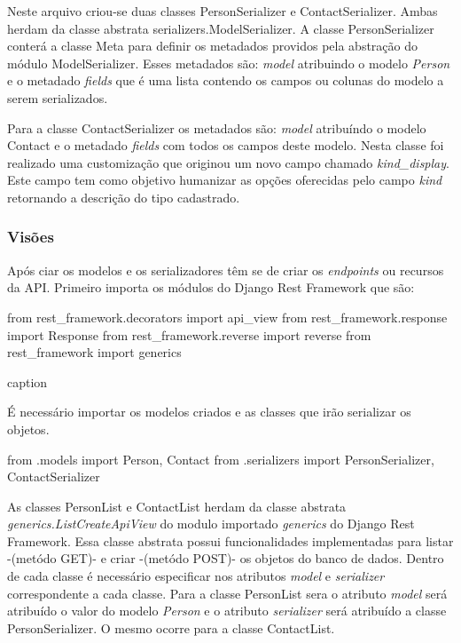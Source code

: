   Neste arquivo criou-se duas classes PersonSerializer e ContactSerializer. Ambas herdam da classe abstrata serializers.ModelSerializer.
  A classe PersonSerializer conterá a classe Meta para definir os metadados providos pela abstração do módulo ModelSerializer. Esses 
  metadados são: \textit{model} atribuindo o modelo \textit{Person} e o metadado \textit{fields} que é uma lista contendo os campos ou colunas
  do modelo a serem serializados.
  
  Para a classe ContactSerializer os metadados são: \textit{model} atribuíndo o modelo Contact e o metadado \textit{fields} com todos os
  campos deste modelo. Nesta classe foi realizado uma customização que originou um novo campo chamado \textit{kind\_display}. Este campo
  tem como objetivo humanizar as opções oferecidas pelo campo \textit{kind} retornando a descrição do tipo cadastrado.

\subsubsection{Visões}

  Após ciar os modelos e os serializadores têm se de criar os \textit{endpoints} ou recursos da API. Primeiro importa os módulos
  do Django Rest Framework que são:
  \begin{algorithm}[H]
  from rest\_framework.decorators import api\_view
  from rest\_framework.response import Response
  from rest\_framework.reverse import reverse
  from rest\_framework import generics
  \caption{caption}
  \end{algorithm}
  
  É necessário importar os modelos criados e as classes que irão serializar os objetos.
  
  from .models import Person, Contact 
  from .serializers import PersonSerializer, ContactSerializer
  
  As classes PersonList e ContactList herdam da classe abstrata \textit{generics.ListCreateApiView} do modulo
  importado \textit{generics} do Django Rest Framework. Essa classe abstrata possui funcionalidades implementadas para 
  listar -(metódo GET)- e criar -(metódo POST)- os objetos do banco de dados. Dentro de cada classe é necessário especificar
  nos atributos \textit{model} e \textit{serializer} correspondente a cada classe. Para a classe PersonList sera o atributo
  \textit{model} será atribuído o valor do modelo \textit{Person} e o atributo \textit{serializer} será atribuído a classe PersonSerializer. O mesmo ocorre para 
  a classe ContactList.
  
